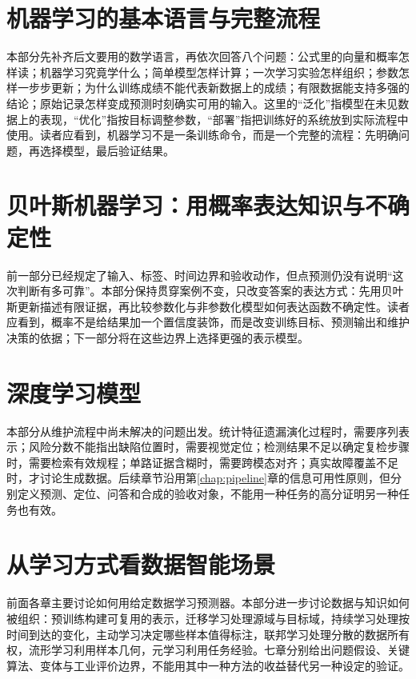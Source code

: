 ﻿\documentclass[a4paper,UTF8,zihao=-4,openany]{ctexbook}
\begin{document}
\mainmatter
\part{机器学习的基本语言与完整流程}
本部分先补齐后文要用的数学语言，再依次回答八个问题：公式里的向量和概率怎样读；机器学习究竟学什么；简单模型怎样计算；一次学习实验怎样组织；参数怎样一步步更新；为什么训练成绩不能代表新数据上的成绩；有限数据能支持多强的结论；原始记录怎样变成预测时刻确实可用的输入。这里的“泛化”指模型在未见数据上的表现，“优化”指按目标调整参数，“部署”指把训练好的系统放到实际流程中使用。读者应看到，机器学习不是一条训练命令，而是一个完整的流程：先明确问题，再选择模型，最后验证结果。







\part{贝叶斯机器学习：用概率表达知识与不确定性}
前一部分已经规定了输入、标签、时间边界和验收动作，但点预测仍没有说明“这次判断有多可靠”。本部分保持贯穿案例不变，只改变答案的表达方式：先用贝叶斯更新描述有限证据，再比较参数化与非参数化模型如何表达函数不确定性。读者应看到，概率不是给结果加一个置信度装饰，而是改变训练目标、预测输出和维护决策的依据；下一部分将在这些边界上选择更强的表示模型。



\part{深度学习模型}
本部分从维护流程中尚未解决的问题出发。统计特征遗漏演化过程时，需要序列表示；风险分数不能指出缺陷位置时，需要视觉定位；检测结果不足以确定复检步骤时，需要检索有效规程；单路证据含糊时，需要跨模态对齐；真实故障覆盖不足时，才讨论生成数据。后续章节沿用第\ref{chap:pipeline}章的信息可用性原则，但分别定义预测、定位、问答和合成的验收对象，不能用一种任务的高分证明另一种任务也有效。







\part{从学习方式看数据智能场景}
前面各章主要讨论如何用给定数据学习预测器。本部分进一步讨论数据与知识如何被组织：预训练构建可复用的表示，迁移学习处理源域与目标域，持续学习处理按时间到达的变化，主动学习决定哪些样本值得标注，联邦学习处理分散的数据所有权，流形学习利用样本几何，元学习利用任务经验。七章分别给出问题假设、关键算法、变体与工业评价边界，不能用其中一种方法的收益替代另一种设定的验证。







\end{document}
